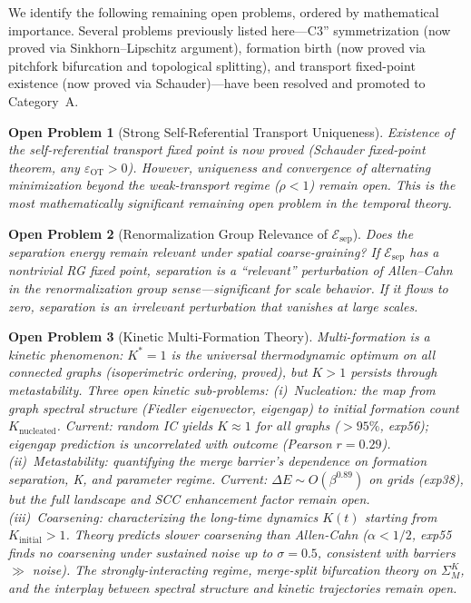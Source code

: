 \documentclass[lettersize,journal]{IEEEtran}
\newtheorem{openproblem}{Open Problem}
\begin{document}
We identify the following remaining open problems, ordered by mathematical importance. Several problems previously listed here---C3'' symmetrization (now proved via Sinkhorn--Lipschitz argument), formation birth (now proved via pitchfork bifurcation and topological splitting), and transport fixed-point existence (now proved via Schauder)---have been resolved and promoted to Category~A.

\begin{openproblem}[Strong Self-Referential Transport Uniqueness]
Existence of the self-referential transport fixed point is now proved (Schauder fixed-point theorem, any $\varepsilon_{\mathrm{OT}} > 0$). However, uniqueness and convergence of alternating minimization beyond the weak-transport regime ($\rho < 1$) remain open. This is the most mathematically significant remaining open problem in the temporal theory.
\end{openproblem}

\begin{openproblem}[Renormalization Group Relevance of $\mathcal{E}_{\mathrm{sep}}$]
Does the separation energy remain relevant under spatial coarse-graining? If $\mathcal{E}_{\mathrm{sep}}$ has a nontrivial RG fixed point, separation is a ``relevant'' perturbation of Allen--Cahn in the renormalization group sense---significant for scale behavior. If it flows to zero, separation is an irrelevant perturbation that vanishes at large scales.
\end{openproblem}

\begin{openproblem}[Kinetic Multi-Formation Theory]
Multi-formation is a kinetic phenomenon: $K^* = 1$ is the universal thermodynamic optimum on all connected graphs (isoperimetric ordering, proved), but $K > 1$ persists through metastability. Three open kinetic sub-problems: (i)~\emph{Nucleation:} the map from graph spectral structure (Fiedler eigenvector, eigengap) to initial formation count $K_{\mathrm{nucleated}}$. Current: random IC yields $K \approx 1$ for all graphs ($>95\%$, exp56); eigengap prediction is uncorrelated with outcome (Pearson $r = 0.29$). (ii)~\emph{Metastability:} quantifying the merge barrier's dependence on formation separation, K, and parameter regime. Current: $\Delta E \sim O(\beta^{0.89})$ on grids (exp38), but the full landscape and SCC enhancement factor remain open. (iii)~\emph{Coarsening:} characterizing the long-time dynamics $K(t)$ starting from $K_{\mathrm{initial}} > 1$. Theory predicts slower coarsening than Allen-Cahn ($\alpha < 1/2$, exp55 finds no coarsening under sustained noise up to $\sigma = 0.5$, consistent with barriers $\gg$ noise). The strongly-interacting regime, merge-split bifurcation theory on $\Sigma^K_M$, and the interplay between spectral structure and kinetic trajectories remain open.
\end{openproblem}
\end{document}
